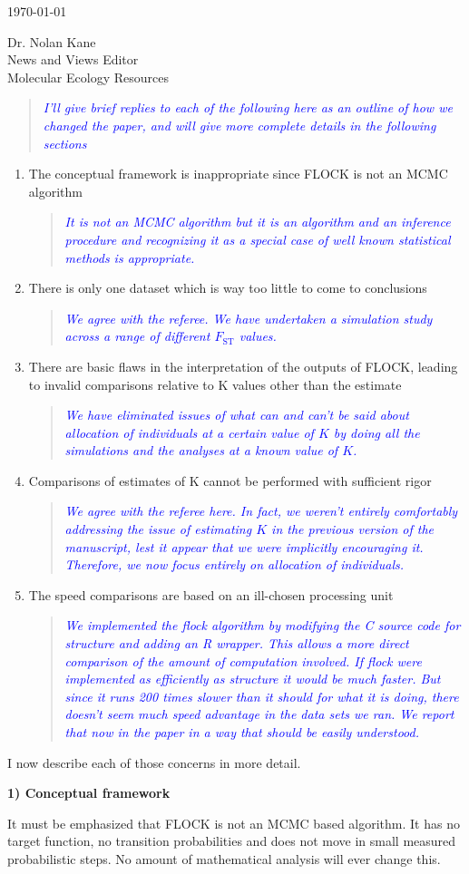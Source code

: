 \documentclass[11pt]{letter}
\newcommand{\reply}[1]{\begin{quotation}\small\sl\textcolor{blue}{#1}\end{quotation}}
\begin{document}
\begin{letter}{ \today 

Dr. Nolan Kane\\
News and Views Editor\\
Molecular Ecology Resources \\
}
\reply{I'll give brief replies to each of the following here as an outline of how we
changed the paper, and will give more complete details in the following sections}
\begin{enumerate}
\item The conceptual framework is inappropriate since FLOCK is not an MCMC algorithm
\reply{It is not an MCMC algorithm but it {\em is} an algorithm and an inference procedure and 
recognizing it as a special case of well known statistical methods is appropriate.}
\item There is only one dataset which is way too little to come to conclusions
\reply{We agree with the referee. We have undertaken a simulation study across a range of different $F_\mathrm{ST}$ values.}
\item There are basic flaws in the interpretation of the outputs of FLOCK, leading to invalid
comparisons relative to K values other than the estimate
\reply{We have eliminated issues of what can and can't be said about allocation of individuals  at a
certain value of $K$ by doing all the simulations and the analyses at a known value of $K$.}
\item Comparisons of estimates of K cannot be performed with sufficient rigor
\reply{We agree with the referee here.  In fact, we weren't entirely comfortably addressing the issue of estimating
$K$ in the previous version of the manuscript, lest it appear that we were implicitly encouraging it. 
Therefore, we now focus entirely on allocation of individuals.}
\item The speed comparisons are based on an ill-chosen processing unit
\reply{We implemented the {\sc flock} algorithm by modifying the C source code for {\sc structure} and
adding an R wrapper.  This allows a more direct comparison of the amount of computation involved.  If 
{\sc flock} were implemented as efficiently as {\sc structure} it would be much faster.  But since it
runs 200 times slower than it should for what it is doing, there doesn't seem much speed advantage in 
the data sets we ran.  We report that now in the paper in a way that should be easily understood. }
\end{enumerate}

I now describe each of those concerns in more detail.

{\bf 1) Conceptual framework}

It must be emphasized that FLOCK is not an MCMC based algorithm. It has no target function, no transition probabilities and does not move in small measured probabilistic steps. No amount of mathematical analysis will ever change this. 


\end{letter}
\end{document}
